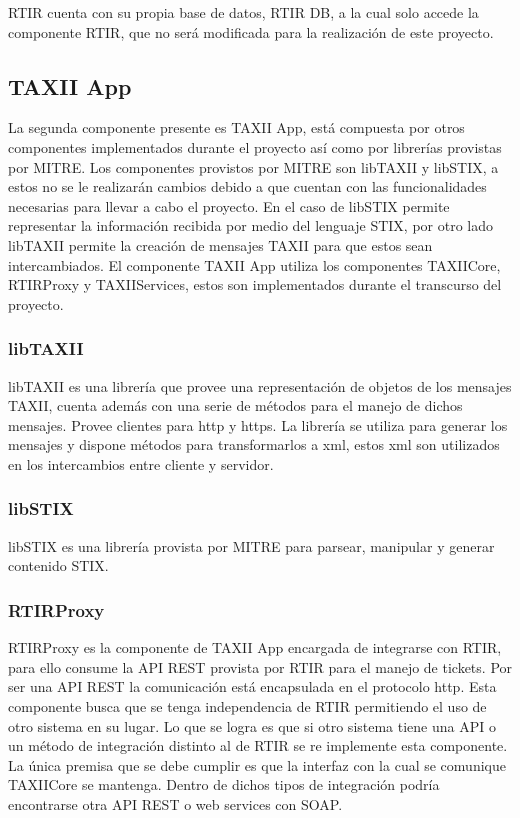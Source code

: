	RTIR cuenta con su propia base de datos, RTIR DB, a la cual solo accede la componente RTIR, que no será modificada para la realización de este proyecto.
	
	
	\bigskip
	
	\subsection{TAXII App}
	
	\bigskip
	
	La segunda componente presente es TAXII App, está compuesta por otros componentes
		implementados durante el proyecto así como por librerías provistas por MITRE. Los componentes provistos por MITRE son
		libTAXII y libSTIX, a estos no se le realizarán cambios debido a que cuentan con las funcionalidades necesarias para
		llevar a cabo el proyecto. En el caso de libSTIX permite representar la información recibida por medio del lenguaje
		STIX, por otro lado libTAXII permite la creación de mensajes TAXII para que estos sean intercambiados. El componente
		TAXII App utiliza los componentes TAXIICore, RTIRProxy y TAXIIServices, estos son implementados durante el transcurso
		del proyecto.
	
	\subsubsection{libTAXII}
	libTAXII \cite{libtaxii} es una librería que provee una representación de objetos de los mensajes TAXII, cuenta además
		con una serie de métodos para el manejo de dichos mensajes. Provee clientes para http y https. La librería se utiliza
		para generar los mensajes y dispone métodos para transformarlos a xml, estos xml son utilizados en los intercambios
		entre cliente y servidor.
	
	\subsubsection{libSTIX}
	libSTIX es una librería provista por MITRE para parsear, manipular y generar contenido STIX.
	
	\subsubsection{RTIRProxy}
	RTIRProxy es la componente de TAXII App encargada de integrarse con RTIR, para ello consume la
		API REST provista por RTIR para el manejo de tickets. Por ser una API REST la comunicación está encapsulada en el
		protocolo http. Esta componente busca que se tenga independencia de RTIR permitiendo el uso de otro sistema en su
		lugar. Lo que se logra es que si otro sistema tiene una API
		o un método de integración distinto al de RTIR se re implemente esta componente. La única premisa que se debe cumplir
		es que la interfaz con la cual se comunique TAXIICore se mantenga. Dentro de dichos tipos de integración podría
		encontrarse otra API REST o web services con SOAP.
	

